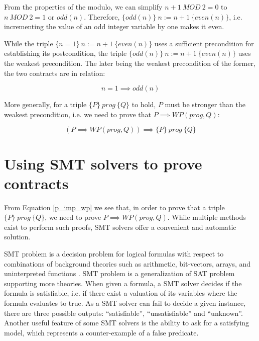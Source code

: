 \documentclass{kththesis}
\newcommand{\htriple}[3]{\ensuremath{\{#1\}~#2~\{#3\}}}
\newcommand{\WP}{\ensuremath{\mathit{WP}}}
\begin{document}
{From the properties of the modulo, we can simplify $n+1~MOD~2 = 0$ to $n~MOD~2 = 1$ or $odd(n)$. Therefore, \htriple{odd(n)}{n:=n+1}{even(n)}, i.e. incrementing the value of an odd integer variable by one makes it even.

While the triple \htriple{n=1}{n:=n+1}{even(n)} uses a sufficient precondition for establishing its postcondition, the triple \htriple{odd(n)}{n:=n+1}{even(n)} uses the weakest precondition. The later being the weakest precondition of the former, the two contracts are in relation:

\begin{equation}
  n=1 \implies odd(n)
\end{equation}

More generally, for a triple \htriple{P}{prog}{Q} to hold, $P$ must be stronger than the weakest precondition, i.e. we need to prove that $P \implies \WP(prog, Q)$:


\begin{equation}
  (P \implies \WP(prog, Q)) \implies \htriple{P}{prog}{Q}
  \label{p_imp_wp}
\end{equation}

\section{Using SMT solvers to prove contracts} \label{using-smt-to-prove-contracts}

From Equation \ref{p_imp_wp} we see that, in order to prove that a triple \htriple{P}{prog}{Q}, we need to prove $P \implies \WP(prog, Q)$. While multiple methods exist to perform such proofs, \acrshort{SMT} solvers offer a convenient and automatic solution.

\acrfull{SMT} problem is a decision problem for logical formulas with respect to combinations of background theories such as arithmetic, bit-vectors, arrays, and uninterpreted functions \cite{nikolaj_bjorner_programming_2019}. \gls{SMT} problem is a generalization of \gls{SAT} problem supporting more theories. When given a formula, a \gls{SMT} solver decides if the formula is satisfiable, i.e. if there exist a valuation of its variables where the formula evaluates to true. As a \gls{SMT} solver can fail to decide a given instance, there are three possible outputs: ``satisfiable'', ``unsatisfiable'' and ``unknown''. Another useful feature of some \gls{SMT} solvers is the ability to ask for a satisfying model, which represents a counter-example of a false predicate.

}
\end{document}
